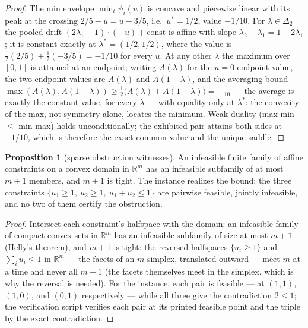 \documentclass[10pt,twocolumn]{article}
\theoremstyle{definition}
\newtheorem{proposition}{Proposition}
\begin{document}
\begin{proof}
The min envelope \(\min_i \psi_i(u)\) is concave and piecewise
linear with its peak at the crossing \(2/5 - u = u - 3/5\), i.e.\
\(u^{*} = 1/2\), value \(-1/10\). For \(\lambda \in \Delta_2\)
the pooled drift \((2\lambda_1 - 1)\cdot(-u) + \text{const}\) is
affine with slope \(\lambda_2 - \lambda_1 = 1 - 2\lambda_1\); it is
constant exactly at \(\lambda^{*} = (1/2, 1/2)\), where the value is
\(\tfrac12(2/5) + \tfrac12(-3/5) = -1/10\) for every \(u\). At any
other \(\lambda\) the maximum over \([0,1]\) is attained at an
endpoint; writing \(A(\lambda)\) for the \(u = 0\) endpoint value, the
two endpoint values are \(A(\lambda)\) and \(A(1 - \lambda)\), and
the averaging bound
\(\max(A(\lambda), A(1-\lambda)) \ge \tfrac12\bigl(A(\lambda) +
A(1-\lambda)\bigr) = -\tfrac1{10}\) --- the average is exactly the
constant value, for every \(\lambda\) --- with equality only at
\(\lambda^{*}\): the convexity of the max, not symmetry alone, locates
the minimum. Weak duality (max-min \(\le\) min-max)
holds unconditionally; the exhibited pair attains both sides at
\(-1/10\), which is therefore the exact common value and the unique
saddle.
\end{proof}

\begin{proposition}[sparse obstruction witnesses]\label{prop:helly}
An infeasible finite family of affine constraints on a convex domain in
\(\mathbb{R}^m\) has an infeasible subfamily of at most \(m + 1\)
members, and \(m + 1\) is tight. The instance realizes the bound: the
three constraints \(\{u_1 \ge 1,\ u_2 \ge 1,\ u_1 + u_2 \le 1\}\)
are pairwise feasible, jointly infeasible, and no two of them certify
the obstruction.
\end{proposition}

\begin{proof}
Intersect each constraint's halfspace with the domain: an infeasible
family of compact convex sets in \(\mathbb{R}^m\) has an infeasible
subfamily of size at most \(m + 1\) (Helly's theorem), and \(m + 1\)
is tight: the reversed halfspaces \(\{u_i \ge 1\}\) and
\(\sum_i u_i \le 1\) in \(\mathbb{R}^m\) --- the facets of an
\(m\)-simplex, translated outward --- meet \(m\) at a time and never
all \(m+1\) (the facets themselves meet in the simplex, which is why
the reversal is needed). For the
instance, each pair is feasible --- at \((1,1)\), \((1,0)\), and
\((0,1)\) respectively --- while all three give the contradiction
\(2 \le 1\); the verification script verifies each pair at its printed
feasible point and the triple by the exact contradiction.
\end{proof}
\end{document}
